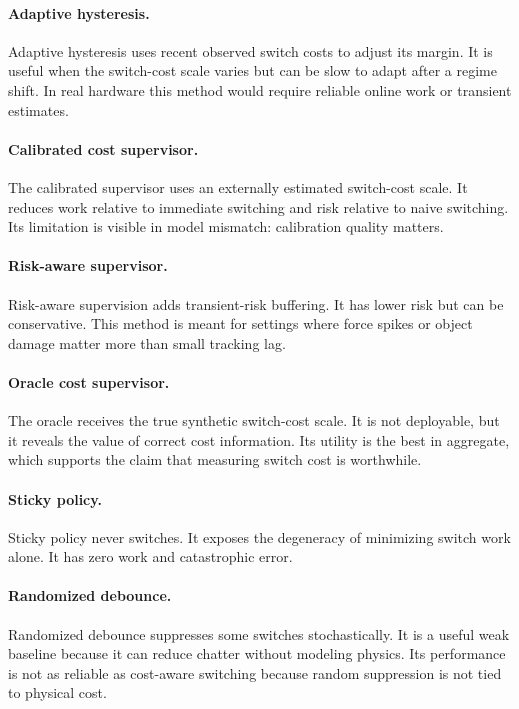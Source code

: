 \documentclass{article}
\begin{document}
\paragraph{Adaptive hysteresis.}
Adaptive hysteresis uses recent observed switch costs to adjust its margin.
It is useful when the switch-cost scale varies but can be slow to adapt after a regime shift.
In real hardware this method would require reliable online work or transient estimates.

\paragraph{Calibrated cost supervisor.}
The calibrated supervisor uses an externally estimated switch-cost scale.
It reduces work relative to immediate switching and risk relative to naive switching.
Its limitation is visible in model mismatch: calibration quality matters.

\paragraph{Risk-aware supervisor.}
Risk-aware supervision adds transient-risk buffering.
It has lower risk but can be conservative.
This method is meant for settings where force spikes or object damage matter more than small tracking lag.

\paragraph{Oracle cost supervisor.}
The oracle receives the true synthetic switch-cost scale.
It is not deployable, but it reveals the value of correct cost information.
Its utility is the best in aggregate, which supports the claim that measuring switch cost is worthwhile.

\paragraph{Sticky policy.}
Sticky policy never switches.
It exposes the degeneracy of minimizing switch work alone.
It has zero work and catastrophic error.

\paragraph{Randomized debounce.}
Randomized debounce suppresses some switches stochastically.
It is a useful weak baseline because it can reduce chatter without modeling physics.
Its performance is not as reliable as cost-aware switching because random suppression is not tied to physical cost.
\end{document}
